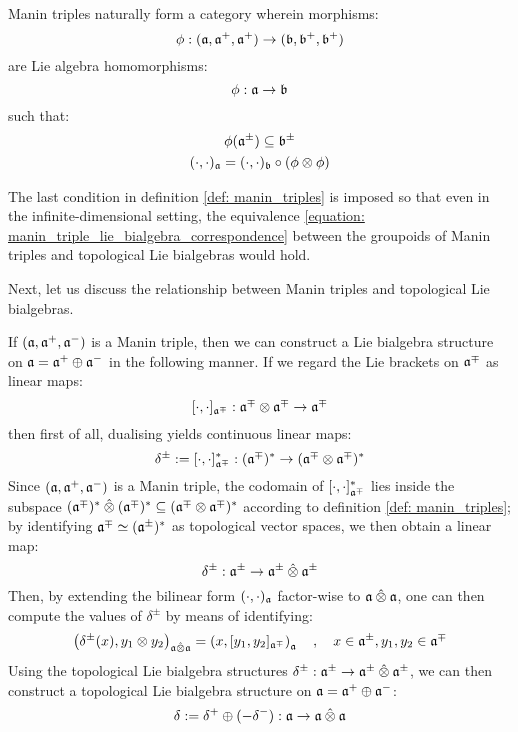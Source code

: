 Manin triples naturally form a category wherein morphisms:
    $$\phi: (\mathfrak{a}, \mathfrak{a}^+, \mathfrak{a}^+) \to (\mathfrak{b}, \mathfrak{b}^+, \mathfrak{b}^+)$$
are Lie algebra homomorphisms:
    $$\phi: \mathfrak{a} \to \mathfrak{b}$$
such that:
    \begin{equation} \label{equation: morphisms_of_manin_triples}
        \begin{gathered}
            \phi( \a^{\pm} ) \subseteq \b^{\pm}
            \\
            (\cdot, \cdot)_{\a} = (\cdot, \cdot)_{\b} \circ (\phi \tensor \phi)
        \end{gathered}
    \end{equation}
\begin{remark}
    The last condition in definition \ref{def: manin_triples} is imposed so that even in the infinite-dimensional setting, the equivalence \eqref{equation: manin_triple_lie_bialgebra_correspondence} between the groupoids of Manin triples and topological Lie bialgebras would hold.
\end{remark}


Next, let us discuss the relationship between Manin triples and topological Lie bialgebras.

If $(\mathfrak{a}, \mathfrak{a}^+, \mathfrak{a}^-)$ is a Manin triple, then we can construct a Lie bialgebra structure on $\mathfrak{a} = \mathfrak{a}^+ \oplus \mathfrak{a}^-$ in the following manner. If we regard the Lie brackets on $\mathfrak{a}^{\mp}$ as linear maps:
    $$[\cdot, \cdot]_{\a^{\mp}}: \a^{\mp} \tensor \a^{\mp} \to \a^{\mp}$$
then first of all, dualising yields continuous linear maps:
    \begin{equation} \label{equation: dual_of_lie_brackets}
        \delta^{\pm} := [\cdot, \cdot]_{\a^{\mp}}^*: (\a^{\mp})^{*} \to (\a^{\mp} \tensor \a^{\mp})^*
    \end{equation}
Since $(\mathfrak{a}, \mathfrak{a}^+, \mathfrak{a}^-)$ is a Manin triple, the codomain of $[\cdot, \cdot]_{\mathfrak{a}^{\mp}}^*$ lies inside the subspace $(\a^{\mp})^{*} \hattensor (\a^{\mp})^{*} \subseteq (\a^{\mp} \tensor \a^{\mp})^*$ according to definition \ref{def: manin_triples}; by identifying $\mathfrak{a}^{\mp} \simeq (\mathfrak{a}^{\pm})^*$ as topological vector spaces, we then obtain a linear map:
    $$\delta^{\pm}: \a^{\pm} \to \a^{\pm} \hattensor \a^{\pm}$$
Then, by extending the bilinear form $(\cdot, \cdot)_{\mathfrak{a}}$ factor-wise to $\a \hattensor \a$, one can then compute the values of $\delta^{\pm}$ by means of identifying:
    \begin{equation} \label{equation: lie_cobrackets_by_duality}
        \left( \delta^{\pm}(x), y_1 \tensor y_2 \right)_{\a \hattensor \a} = \left( x, [y_1, y_2]_{\a^{\mp}} \right)_{\a} \quad, \quad x \in \a^{\pm}, y_1, y_2 \in \a^{\mp}
    \end{equation}
Using the topological Lie bialgebra structures $\delta^{\pm}: \a^{\pm} \to \a^{\pm} \hattensor \a^{\pm}$, we can then construct a topological Lie bialgebra structure on $\mathfrak{a} = \mathfrak{a}^+ \oplus \mathfrak{a}^-$:
    $$\delta := \delta^+ \oplus (-\delta^-): \a \to \a \hattensor \a$$


